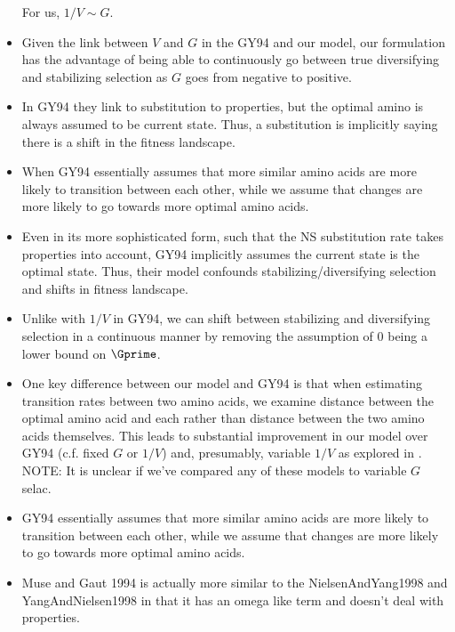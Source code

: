 \begin{itemize}
    For us, $1/V \sim G$.
\item Given the link between $V$ and $G$ in the GY94 and our model, our formulation has the advantage of being able to continuously go between true diversifying and stabilizing selection as $G$ goes from negative to positive.
\item In GY94 they link to substitution to \PC properties, but the optimal amino is always assumed to be current state.
Thus, a substitution is implicitly saying there is a shift in the fitness landscape.
\item When GY94 essentially assumes that more similar amino acids are more likely to transition between each other, while we assume that changes are more likely to go towards more optimal amino acids. 
\item Even in its more sophisticated form, such that the NS substitution rate takes \PC properties into account, GY94 implicitly assumes the current state is the optimal state.
Thus, their model confounds stabilizing/diversifying selection and shifts in fitness landscape.
\item Unlike with $1/V$ in GY94, we can shift between stabilizing and diversifying selection in a continuous manner by removing the assumption of 0 being a lower bound on $\Gprime$.
\item One key difference between our model and GY94 is that when estimating transition rates between two amino acids, we examine distance between the optimal amino acid and each rather than distance between the two amino acids themselves.
This leads to substantial improvement in our model over GY94 (c.f. fixed $G$ or $1/V$) and, presumably, variable $1/V$ as explored in \citet{YangEtAl08}. NOTE: It is unclear if we've compared any of these models to variable $G$ selac.
\item GY94 essentially assumes that more similar amino acids are more likely to transition between each other, while we assume that changes are more likely to go towards more optimal amino acids. 
\item Muse and Gaut 1994 is actually more similar to the NielsenAndYang1998 and YangAndNielsen1998 in that it has an omega like term and doesn't deal with \PC properties.

\end{itemize}
